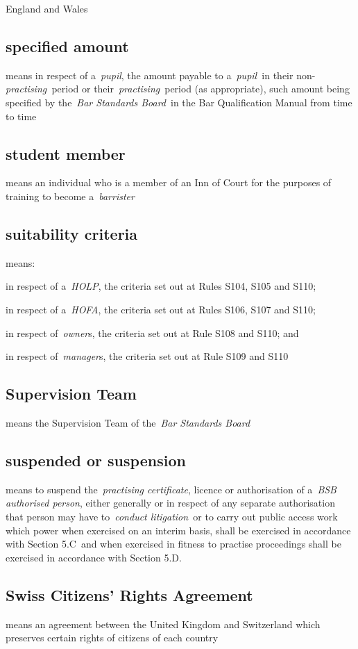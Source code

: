   England and Wales  \subsection{specified amount } means in respect of a~\emph{pupil}, the
  amount payable to a~\emph{pupil~}in their non-\emph{practising~}period
  or their~\emph{practising}~period (as appropriate), such amount being
  specified by the~\emph{Bar Standards Board}~in the Bar Qualification
  Manual from time to time  \subsection{student member } means an individual who is a member of an
  Inn of Court for the purposes of training to become
  a~\emph{barrister} \subsection{suitability criteria } means: \al  \item in respect of a~\emph{HOLP},
  the criteria set out at Rules S104, S105 and S110;  \item in respect of
  a~\emph{HOFA}, the criteria set out at Rules S106, S107 and S110;  \item
  in respect of~\emph{owner}s, the criteria set out at Rule S108 and
  S110; and  \item in respect of~\emph{manager}s, the criteria set out at
  Rule S109 and S110 \la  \subsection{Supervision Team } means the Supervision Team of
  the~\emph{Bar Standards Board} \subsection{suspended or suspension } means to suspend
  the~\emph{practising certificate}, licence or authorisation of
  a~\emph{BSB authorised person}, either generally or in respect of any
  separate authorisation that person may have to~\emph{conduct
  litigation~}or to carry out public access work which power when
  exercised on an interim basis, shall be exercised in accordance with
  Section 5.C~and when exercised in fitness to practise proceedings
  shall be exercised in accordance with Section 5.D.  \subsection{Swiss Citizens' Rights Agreement }means an agreement between
  the United Kingdom and Switzerland which preserves certain rights of
  citizens of each country~
